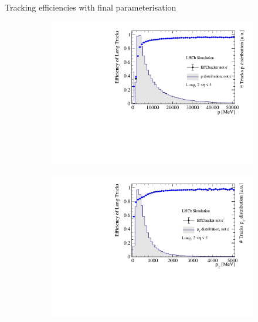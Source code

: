 \documentclass[xcolor={dvipsnames}]{beamer}
\begin{document}
\begin{frame}{Tracking efficiencies with final parameterisation}
  \vspace{0.0cm}
  \begin{figure}[htb]
    \centering
    \begin{subfigure}{0.45\textwidth}
      \includegraphics[width=1\textwidth]{Plots/TrackEfficiency_p_improved_MC_parameterisation.pdf}
    \end{subfigure}%
    \begin{subfigure}{0.45\textwidth}
      \includegraphics[width=1\textwidth]{Plots/TrackEfficiency_pt_improved_MC_parameterisation.pdf}
    \end{subfigure}
    \begin{subfigure}{0.45\textwidth}

\end{subfigure}
\end{figure}
\end{frame}
\end{document}
